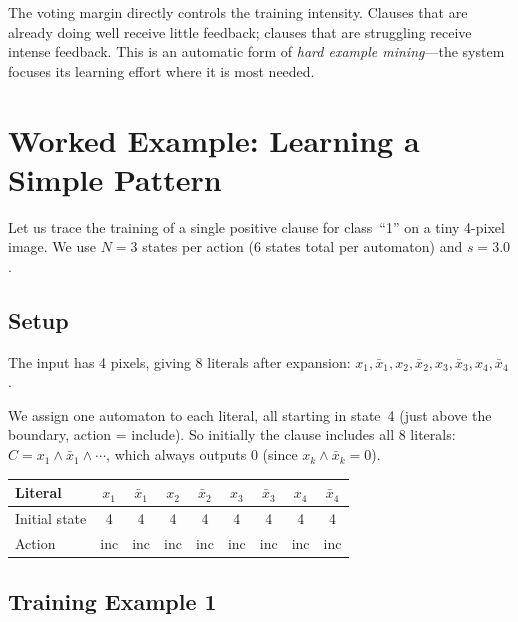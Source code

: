 \begin{keyinsight}
The voting margin directly controls the training intensity. Clauses
that are already doing well receive little feedback; clauses that are
struggling receive intense feedback. This is an automatic form of
\emph{hard example mining}---the system focuses its learning effort
where it is most needed.
\end{keyinsight}


\section{Worked Example: Learning a Simple Pattern}
\label{sec:worked-example}

Let us trace the training of a single positive clause for class~``1''
on a tiny 4-pixel image. We use $N = 3$ states per action (6 states
total per automaton) and $s = 3.0$.

\subsection{Setup}

The input has 4 pixels, giving 8 literals after expansion:
$x_1, \bar{x}_1, x_2, \bar{x}_2, x_3, \bar{x}_3, x_4, \bar{x}_4$.

We assign one automaton to each literal, all starting in state~4
(just above the boundary, action = include). So initially the clause
includes all 8 literals: $C = x_1 \wedge \bar{x}_1 \wedge \cdots$,
which always outputs 0 (since $x_k \wedge \bar{x}_k = 0$).

\begin{center}
\begin{tabular}{@{}l*{8}{c}@{}}
  \toprule
  \textbf{Literal} & $x_1$ & $\bar{x}_1$ & $x_2$ & $\bar{x}_2$ &
    $x_3$ & $\bar{x}_3$ & $x_4$ & $\bar{x}_4$ \\
  \midrule
  Initial state & 4 & 4 & 4 & 4 & 4 & 4 & 4 & 4 \\
  Action & inc & inc & inc & inc & inc & inc & inc & inc \\
  \bottomrule
\end{tabular}
\end{center}

\subsection{Training Example 1}

